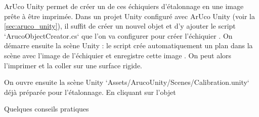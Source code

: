 ArUco Unity permet de créer un de ces échiquiers d'étalonnage en une image prête à être imprimée. Dans un projet Unity configuré avec ArUco Unity (voir la \autoref{sec:aruco_unity}), il suffit de créer un nouvel objet  et d'y ajouter le script `ArucoObjectCreator.cs`  que l'on va configurer pour créer l'échiquier . On démarre ensuite la scène Unity : le script crée automatiquement un plan dans la scène avec l'image de l'échiquier et enregistre cette image . On peut alors l'imprimer et la coller sur une surface rigide.


On ouvre ensuite la scène Unity `Assets/ArucoUnity/Scenes/Calibration.unity` déjà préparée pour l'étalonnage. En cliquant sur l'objet 


Quelques conseils pratiques 


